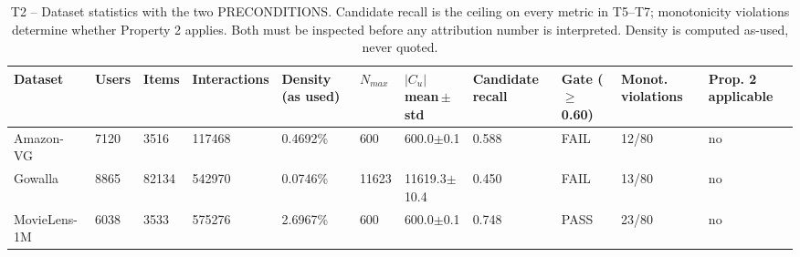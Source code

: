 \begin{table}[htbp]
\centering
\footnotesize
\caption{T2 -- Dataset statistics with the two PRECONDITIONS. Candidate recall is the ceiling on every metric in T5–T7; monotonicity violations determine whether Property 2 applies. Both must be inspected before any attribution number is interpreted. Density is computed as-used, never quoted.}
\label{tab:T2_datasets}
\begin{tabular}{lllllllllll}
\toprule
Dataset & Users & Items & Interactions & Density (as used) & $N_{max}$ & $|C_u|$ mean\,$\pm$\,std & Candidate recall & Gate ($\geq$0.60) & Monot. violations & Prop. 2 applicable \\
\midrule
Amazon-VG & 7120 & 3516 & 117468 & 0.4692\% & 600 & 600.0$\pm$0.1 & 0.588 & FAIL & 12/80 & no \\
Gowalla & 8865 & 82134 & 542970 & 0.0746\% & 11623 & 11619.3$\pm$10.4 & 0.450 & FAIL & 13/80 & no \\
MovieLens-1M & 6038 & 3533 & 575276 & 2.6967\% & 600 & 600.0$\pm$0.1 & 0.748 & PASS & 23/80 & no \\
\bottomrule
\end{tabular}
\end{table}
